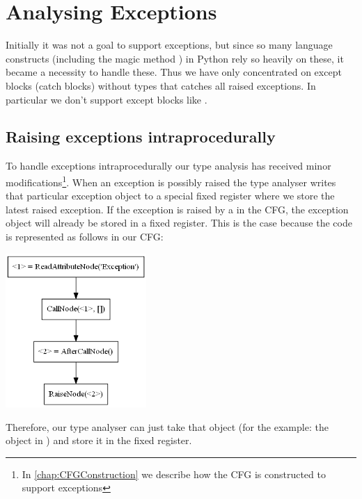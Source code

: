\chapter{Analysing Exceptions}
\label{chapter:Exceptions}
Initially it was not a goal to support exceptions, but since so many language constructs (including the magic method ) in Python rely so heavily on these, it became a necessity to handle these. Thus we have only concentrated on except blocks (catch blocks) without types that catches all raised exceptions. In particular we don't support except blocks like .

\section{Raising exceptions intraprocedurally}
To handle exceptions intraprocedurally our type analysis has received minor modifications\footnote{In \autoref{chap:CFGConstruction} we describe how the CFG is constructed to support exceptions}. When an exception is possibly raised the type analyser writes that particular exception object to a special fixed register where we store the latest raised exception. If the exception is raised by a  in the CFG, the exception object will already be stored in a fixed register. This is the case because the code  is represented as follows in our CFG:

\begin{listing}[H]
	\begin{center}
		\includegraphics[width=0.4\textwidth]{images/raiseexception.png}
	\end{center}
	\vspace{-20pt}
\end{listing}

Therefore, our type analyser can just take that object (for the example: the object in ) and store it in the fixed register.

